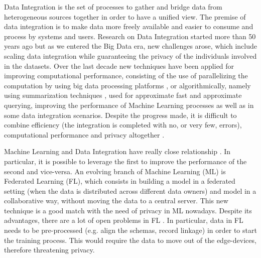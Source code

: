 \documentclass[12pt]{article}
\begin{document}
Data Integration is the set of processes to gather and bridge data from heterogeneous sources together in order to 
have a unified view. The premise of data integration is to make data more freely available and easier 
to consume and process by systems and users.
Research on Data Integration started more than 50 years ago \cite*{recordLinkTheory,dataModelIntegration1980} but as we entered the Big Data era, new challenges arose,
 which include scaling \cite*{Dong2013} data integration while guaranteeing the privacy \cite*{yu2016big, Gkoulalas-Divanis2021} of the individuals involved in the datasets.
Over the last decade new techniques have been applied for improving computational performance, consisting of the use of parallelizing the computation by using big data processing platforms \cite*{Dong2013},
 or algorithmically, namely using summarization techniques \cite*{Cormode2011}, used for 
approximate fast and approximate querying, improving the performance of Machine Learning processes \cite*{Gribonval2020, Antonanzas2021, Jiang2018} as well as in some data integration scenarios.
Despite the progress made, it is difficult to combine efficiency (the integration is completed with no, or very few, errors), computational performance and privacy altogether \cite*{He2017}. 


Machine Learning and Data Integration have really close relationship \cite*{Dong2019}. In particular, it is possible to leverage the first to improve the performance of the second
and vice-versa. An evolving branch of Machine Learning (ML) is Federated Learning (FL), which consists in building a model in a federated setting (when the data is distributed across different data owners) and model in a collaborative way, without moving the data to a central server. This new technique is a good match with the need of privacy in ML nowadays. Despite its advantages, 
 there are a lot of open problems in FL \cite*{Kairouz2021}. In particular, data in FL needs to be pre-processed (e.g. align the schemas, record linkage) in order to start the training process. This would 
 require the data to move out of the edge-devices, therefore threatening privacy.
\end{document}
